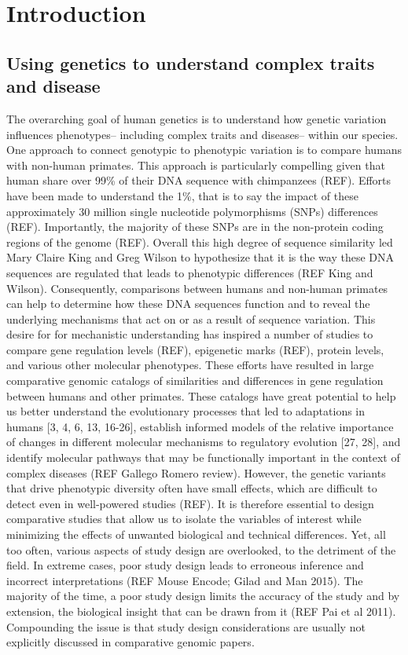 \chapter{Introduction}

\section{Using genetics to understand complex traits and disease}

The overarching goal of human genetics is to understand how genetic variation influences phenotypes-- including complex traits and diseases-- within our species.  One approach to connect genotypic to phenotypic variation is to compare humans with non-human primates. This approach is particularly compelling given that human share over 99\% of their DNA sequence with chimpanzees (REF). Efforts have been made to understand the 1\%, that is to say the impact of these approximately 30 million single nucleotide polymorphisms (SNPs) differences (REF). Importantly, the majority of these SNPs are in the non-protein coding regions of the genome (REF).  
Overall this high degree of sequence similarity led Mary Claire King and Greg Wilson to hypothesize that it is the way these DNA sequences are regulated that leads to phenotypic differences (REF King and  Wilson). Consequently, comparisons between humans and non-human primates can help to determine how these DNA sequences function and to reveal the underlying mechanisms that act on or as a result of sequence variation. This desire for for mechanistic understanding has inspired a number of studies to compare gene regulation levels (REF), epigenetic marks (REF), protein levels, and various other molecular phenotypes. 
These efforts have resulted in large comparative genomic catalogs of similarities and differences in gene regulation between humans and other primates. These catalogs have great potential to help us better understand the evolutionary processes that led to adaptations in humans [3, 4, 6, 13, 16-26], establish informed models of the relative importance of changes in different molecular mechanisms to regulatory evolution [27, 28], and identify molecular pathways that may be functionally important in the context of complex diseases (REF Gallego Romero review). However, the genetic variants that drive phenotypic diversity often have small effects, which are difficult to detect even in well-powered studies (REF). It is therefore essential to design comparative studies that allow us to isolate the variables of interest while minimizing the effects of unwanted biological and technical differences. Yet, all too often, various aspects of study design are overlooked, to the detriment of the field. In extreme cases, poor study design leads to erroneous inference and incorrect interpretations (REF Mouse Encode; Gilad and Man 2015). The majority of the time, a poor study design limits the accuracy of the study and by extension, the biological insight that can be drawn from it (REF Pai et al 2011). Compounding the issue is that study design considerations are usually not explicitly discussed in comparative genomic papers. 

